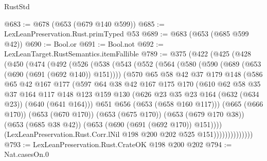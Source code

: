 \begin{lexlean}{RustStd}
\begin{coremodule}
@683 := @678 (@653 (@679 @140 @599))
@685 := LexLeanPreservation.Rust.primTyped @53
@689 := @683 (@653 (@685 @599 @42))
@690 := Bool.or
@691 := Bool.not
@692 := LexLeanTarget.RustSemantics.itemFallible
@789 := @375
    (@422
      (@425
        (@428
          (@450
            (@474
              (@492
                (@526
                  (@538
                    (@543
                      (@552
                        (@564
                          (@580
                            (@590 (@689 (@653 (@690 (@691 (@692 @140)) @151))))
                            (@570
                              @65
                              @58
                              @42
                              @37
                              @179
                              @148
                              (@586
                                @65
                                @42
                                @167
                                @177
                                (@597
                                  @64
                                  @38
                                  @42
                                  @167
                                  @175
                                  @170
                                  (@610
                                    @62
                                    @58
                                    @35
                                    @37
                                    @164
                                    @117
                                    @148
                                    @123
                                    @159
                                    @130
                                    (@626 @23 @35 @23 @164 (@632 (@634 @23)) (@640 (@641 @164)))
                                    @651
                                    @656
                                    (@653 (@658 @160 @117)))
                                  (@665 (@666 @170))
                                  (@653 (@670 @170))
                                  (@653 (@675 @170))
                                  (@653 (@679 @170 @38))
                                  (@653 (@685 @38 @42))
                                  (@653 (@690 (@691 (@692 @170)) @151))))
                              (LexLeanPreservation.Rust.Corr.lNil
                                @198
                                @200
                                @202
                                @525
                                @151))))))))))))))
@793 := LexLeanPreservation.Rust.CrateOK @198 @200 @202
@794 := Nat.casesOn.{0}

\end{coremodule}
\end{lexlean}

